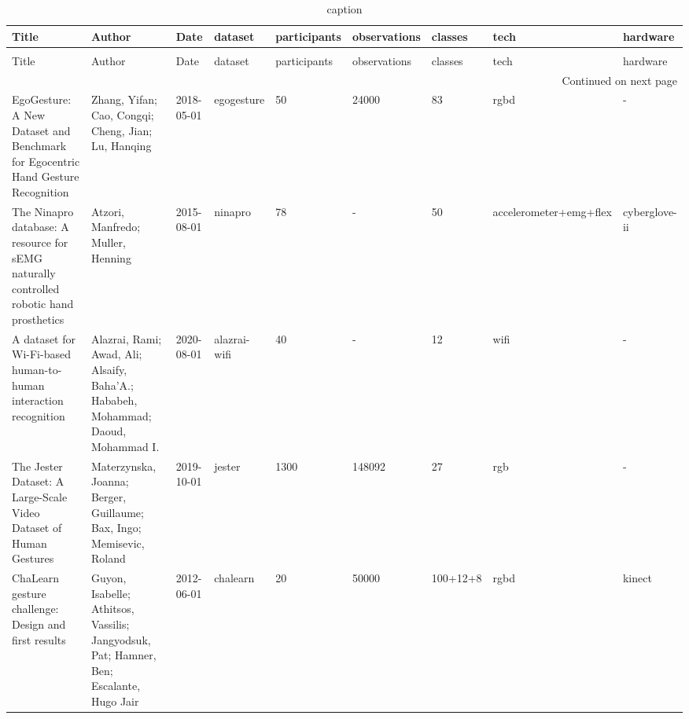 \begin{longtable}{lllllllll}
\caption{caption} \label{tab:} \\
\toprule
Title & Author & Date & dataset & participants & observations & classes & tech & hardware \\
\midrule
\endfirsthead
\caption[]{caption} \\
\toprule
Title & Author & Date & dataset & participants & observations & classes & tech & hardware \\
\midrule
\endhead
\midrule
\multicolumn{9}{r}{Continued on next page} \\
\midrule
\endfoot
\bottomrule
\endlastfoot
EgoGesture: A New Dataset and Benchmark for Egocentric Hand Gesture Recognition & Zhang, Yifan; Cao, Congqi; Cheng, Jian; Lu, Hanqing & 2018-05-01 & egogesture & 50 & 24000 & 83 & rgbd & - \\
The Ninapro database: A resource for sEMG naturally controlled robotic hand prosthetics & Atzori, Manfredo; Muller, Henning & 2015-08-01 & ninapro & 78 & - & 50 & accelerometer+emg+flex & cyberglove-ii \\
A dataset for Wi-Fi-based human-to-human interaction recognition & Alazrai, Rami; Awad, Ali; Alsaify, Baha’A.; Hababeh, Mohammad; Daoud, Mohammad I. & 2020-08-01 & alazrai-wifi & 40 & - & 12 & wifi & - \\
The Jester Dataset: A Large-Scale Video Dataset of Human Gestures & Materzynska, Joanna; Berger, Guillaume; Bax, Ingo; Memisevic, Roland & 2019-10-01 & jester & 1300 & 148092 & 27 & rgb & - \\
ChaLearn gesture challenge: Design and first results & Guyon, Isabelle; Athitsos, Vassilis; Jangyodsuk, Pat; Hamner, Ben; Escalante, Hugo Jair & 2012-06-01 & chalearn & 20 & 50000 & 100+12+8 & rgbd & kinect \\
\end{longtable}

